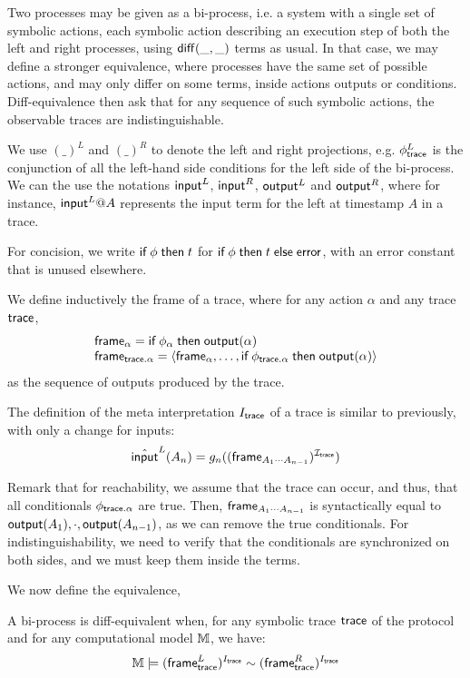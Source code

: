 Two processes may be given as a bi-process, i.e. a system with a single set of
symbolic actions, each symbolic action describing an execution step of both the
left and right processes, using $\mathsf{diff}(\_,\_)$ terms as usual. In that case, we
may define a stronger equivalence, where processes have the same set of possible
actions, and may only differ on some terms, inside actions outputs or
conditions. Diff-equivalence then ask that for any sequence of such symbolic
actions, the observable traces are indistinguishable.

We
use $(\_)^L$ and $(\_)^R$ to denote the left and right projections,
e.g. $\phi_{\textsf{trace}}^L$ is the conjunction of all the left-hand side conditions for
the left side of the bi-process.  We can the use the notations $\textsf{input}^L$, $\textsf{input}^R$, $\textsf{output}^L$
and $\textsf{output}^R$, where for instance, $\textsf{input}^L@A$ represents the input term for
the left at timestamp $A$ in a trace.

For concision, we write $\textsf{if}\; \phi \;\textsf{then}\; t$ for
$\textsf{if}\; \phi \;\textsf{then}\; t \;\textsf{else}\; \mathsf{error}$, with an error constant that is
unused elsewhere.

\begin{definition}
  We define inductively the frame of a trace, where for any action $\alpha$ and any trace $\textsf{trace}$,
  \[\begin{array}{l}
     \textsf{frame}_{\alpha} = \textsf{if}\; \phi_{\alpha} \;\textsf{then}\; \textsf{output}(\alpha) \\
     \textsf{frame}_{\textsf{trace} . \alpha} = \langle \textsf{frame}_\alpha,\dots, \textsf{if}\; \phi_{\textsf{trace} . \alpha} \;\textsf{then}\; \textsf{output}(\alpha) \rangle
     \end{array}\]
  as the sequence of outputs produced by the trace.
\end{definition}

The definition of the meta interpretation $I_{\textsf{trace}}$ of a trace is similar to previously, with only a change for inputs:
\[\hat{\textsf{input}}^L(A_n) = g_n( (\textsf{frame}_{A_1\cdots A_{n-1}})^{\mathcal{I}_{\textsf{trace}}})\]

  Remark that for reachability, we assume that the trace can occur, and thus,
  that all conditionals $\phi_{\textsf{trace} . \alpha}$ are true. Then,
  $\textsf{frame}_{A_1\cdots A_{n-1}}$ is syntactically equal to
    $\textsf{output}(A_1),\cdot,\textsf{output}(A_{n-1})$, as we can remove the true
    conditionals. For indistinguishability, we need to verify that the
    conditionals are synchronized on both sides, and we must keep them inside
    the terms.

We now define the equivalence,


\begin{definition}
  A bi-process is diff-equivalent when,
  for any symbolic trace $\textsf{trace}$ of the protocol and
  for any computational model $\mathbb{M}$,
  we have:
  \[\mathbb{M} \models (\textsf{frame}_{\textsf{trace}}^L)^{I_{\textsf{trace}}}  \sim (\textsf{frame}_{\textsf{trace}}^R)^{I_{\textsf{trace}}}\]
\end{definition}

